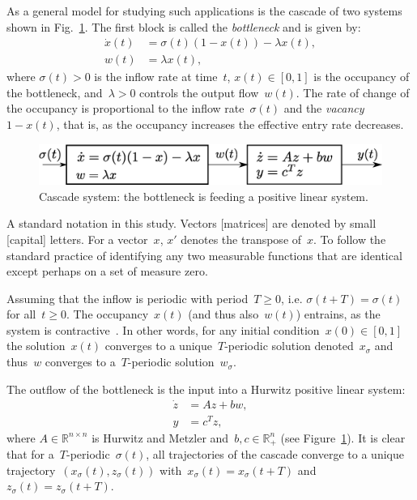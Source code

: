 As a general model for studying such applications is the cascade of two systems shown in Fig.~\ref{f.cascade}. 
The first block is called the \emph{bottleneck} and is given by:
\begin{subequations}
	\begin{align} \label{eq:con}
		\dot{x}(t) &= \sigma(t) (1-x(t)) - \lambda x(t),\\
		w(t)& = \lambda x(t),
	\end{align}
\end{subequations}
where $\sigma(t) >0$ is the inflow rate at time~$t$, $x(t) \in [0,1]$ is the occupancy of the bottleneck, and~$\lambda>0$ controls the output flow~$w(t)$. 
The rate of change of the occupancy is proportional to the inflow rate~$\sigma(t)$ and the \emph{vacancy}~$1-x(t)$, that is, as the occupancy increases the effective entry rate decreases.
\begin{figure}  
	\centering
	\includegraphics[width=0.8\columnwidth]{fig/rfm-cascade.eps}
	\caption[Cascade  system]{Cascade  system:  the bottleneck is feeding a positive linear system.}
	\label{f.cascade}
\end{figure}

A standard notation in this study.
Vectors [matrices] are denoted by small [capital] letters. 
For a vector~$x$, $x'$ denotes the transpose of~$x$. 
To follow the standard  practice of identifying any two measurable functions that are identical except perhaps on a set of measure zero.

Assuming that the inflow is periodic with period~$T\geq 0$, i.e. $\sigma(t+T)=\sigma(t)$ for all~$t\ge0$. 
The occupancy~$x(t)$ (and thus also~$w(t)$) entrains, as the system is  contractive~\cite{aminzare2014contraction,lohmiller1998contraction}. 
In other words, for any initial condition~$x(0)\in[0,1]$ the solution~$x(t)$ converges to a unique~$T$-periodic solution denoted~$x_\sigma$ and thus~$w $ converges to a~$T$-periodic solution~$w_\sigma$.

The outflow of the bottleneck is the input into  a Hurwitz    positive  linear system:
\begin{subequations}
	\begin{align} \label{linear_system}
		\dot z &= Az + b w ,\\
		y & =c^T z,
	\end{align}
\end{subequations}
where $A \in \mathbb R^{n\times n}$  is Hurwitz and Metzler and~$ b,c \in \mathbb R^n_+$ (see Figure~\ref{f.cascade}).
It is clear that for a~$T$-periodic~$\sigma(t)$, all trajectories of the cascade converge to a unique trajectory~$(x_\sigma(t),z_\sigma(t))$ with~$x_\sigma(t)=x_\sigma(t+T)$ and~$z_\sigma(t)=z_\sigma(t+T)$.

